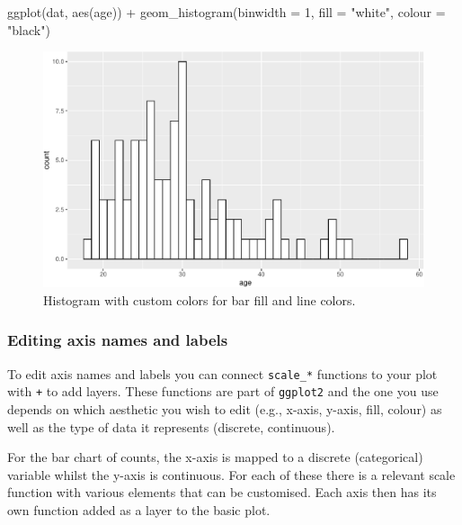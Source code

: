 \documentclass[
  english,
  doc,floatsintext]{apa6}
\newenvironment{Shaded}{\begin{snugshade}}{\end{snugshade}}
\newcommand{\AttributeTok}[1]{\textcolor[rgb]{0.77,0.63,0.00}{#1}}
\newcommand{\DecValTok}[1]{\textcolor[rgb]{0.00,0.00,0.81}{#1}}
\newcommand{\FunctionTok}[1]{\textcolor[rgb]{0.00,0.00,0.00}{#1}}
\newcommand{\NormalTok}[1]{#1}
\newcommand{\SpecialCharTok}[1]{\textcolor[rgb]{0.00,0.00,0.00}{#1}}
\newcommand{\StringTok}[1]{\textcolor[rgb]{0.31,0.60,0.02}{#1}}
\begin{document}
\begin{Shaded}
\begin{Highlighting}[]
\FunctionTok{ggplot}\NormalTok{(dat, }\FunctionTok{aes}\NormalTok{(age)) }\SpecialCharTok{+}
  \FunctionTok{geom\_histogram}\NormalTok{(}\AttributeTok{binwidth =} \DecValTok{1}\NormalTok{, }
                 \AttributeTok{fill =} \StringTok{"white"}\NormalTok{, }
                 \AttributeTok{colour =} \StringTok{"black"}\NormalTok{)}
\end{Highlighting}
\end{Shaded}

\begin{figure}

{\centering \includegraphics[width=1\linewidth]{images/histogram-fill-color-1} 

}

\caption{Histogram with custom colors for bar fill and line colors.}\label{fig:histogram-fill-color}
\end{figure}

\hypertarget{editing-axis-names-and-labels}{%
\subsubsection{Editing axis names and labels}\label{editing-axis-names-and-labels}}

To edit axis names and labels you can connect \texttt{scale\_*} functions to your plot with \texttt{+} to add layers. These functions are part of \texttt{ggplot2} and the one you use depends on which aesthetic you wish to edit (e.g., x-axis, y-axis, fill, colour) as well as the type of data it represents (discrete, continuous).

For the bar chart of counts, the x-axis is mapped to a discrete (categorical) variable whilst the y-axis is continuous. For each of these there is a relevant scale function with various elements that can be customised. Each axis then has its own function added as a layer to the basic plot.
\end{document}
